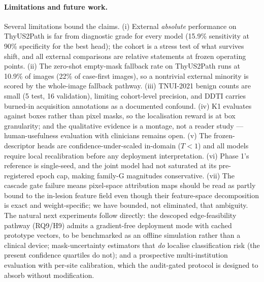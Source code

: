 \documentclass[jimh,article,submit,moreauthors,pdftex]{Definitions/tsp}
\begin{document}
\paragraph{Limitations and future work.}
Several limitations bound the claims. (i) External \emph{absolute}
performance on ThyUS2Path is far from diagnostic grade for every model
(15.9\% sensitivity at 90\% specificity for the best head); the cohort is
a stress test of what survives shift, and all external comparisons are
relative statements at frozen operating points. (ii) The zero-shot
empty-mask fallback rate on ThyUS2Path runs at 10.9\% of images (22\% of
case-first images), so a nontrivial external minority is scored by the
whole-image fallback pathway. (iii) TNUI-2021 benign counts are small (5
test, 16 validation), limiting cohort-level precision, and DDTI carries
burned-in acquisition annotations as a documented confound. (iv) K1
evaluates against boxes rather than pixel masks, so the localisation
reward is at box granularity; and the qualitative evidence is a montage,
not a reader study --- human-usefulness evaluation with clinicians
remains open. (v) The frozen-descriptor heads are confidence-under-scaled
in-domain ($T{<}1$) and all models require local recalibration before any
deployment interpretation. (vi) Phase 1's reference is single-seed, and
the joint model had not saturated at its pre-registered epoch cap, making
family-G magnitudes conservative. (vii) The cascade gate failure means
pixel-space attribution maps should be read as partly bound to the
in-lesion feature field even though their feature-space decomposition is
exact and weight-specific; we have bounded, not eliminated, that
ambiguity. The natural next experiments follow directly: the descoped
edge-feasibility pathway (RQ9/H9) admits a gradient-free deployment mode
with cached prototype vectors, to be benchmarked as an offline simulation
rather than a clinical device; mask-uncertainty estimators that
\emph{do} localise classification risk (the present confidence quartiles
do not); and a prospective multi-institution evaluation with per-site
calibration, which the audit-gated protocol is designed to absorb without
modification.
\end{document}
